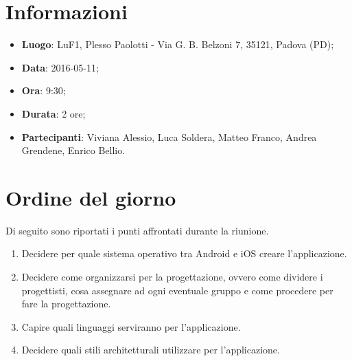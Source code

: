 \documentclass[a4paper,titlepage]{article}
\begin{document}
\maketitle

\begin{diario}
\end{diario}

\newpage
\tableofcontents

\newpage
\section{Informazioni}
\label{sec:Informazioni}

\begin{itemize}
 \item \textbf{Luogo}: LuF1, Plesso Paolotti - Via G. B. Belzoni 7, 35121, Padova (PD);
 \item \textbf{Data}: 2016-05-11;
 \item \textbf{Ora}: 9:30;
 \item \textbf{Durata}: 2 ore;
 \item \textbf{Partecipanti}: Viviana Alessio, Luca Soldera, Matteo Franco, Andrea Grendene, Enrico Bellio.
\end{itemize}

\section{Ordine del giorno}
\label{sec:Ordine del giorno}
Di seguito sono riportati i punti affrontati durante la riunione.

\begin{enumerate}
	\item Decidere per quale sistema operativo tra Android e iOS creare l'applicazione.
	\item Decidere come organizzarsi per la progettazione, ovvero come dividere i progettisti, cosa assegnare ad ogni eventuale gruppo e come procedere per fare la progettazione.
	\item Capire quali linguaggi serviranno per l'applicazione.
	\item Decidere quali stili architetturali utilizzare per l'applicazione.
\end{enumerate}
\end{document}
